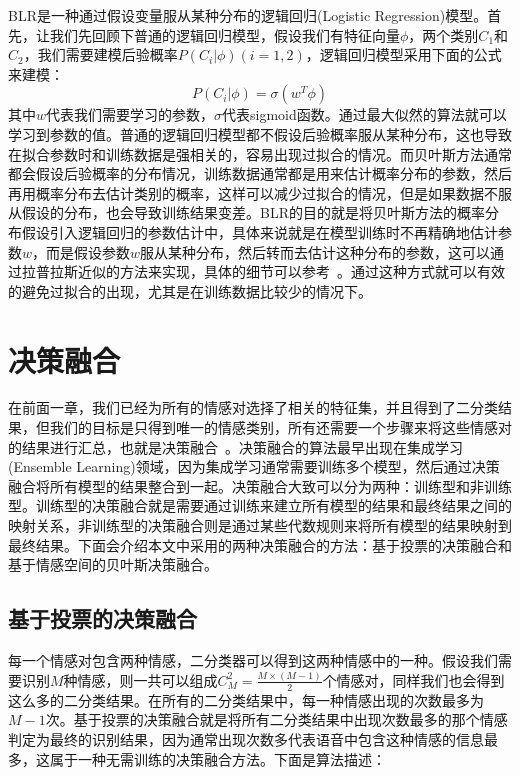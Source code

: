  BLR是一种通过假设变量服从某种分布的逻辑回归(Logistic Regression)模型。首先，让我们先回顾下普通的逻辑回归模型，假设我们有特征向量$\phi$，两个类别$C_1$和$C_2$，我们需要建模后验概率$P(C_i|\phi)(i=1,2)$，逻辑回归模型采用下面的公式来建模：
 \begin{equation}
\label{equ:lagrange_multiplier}
    P(C_i|\phi) = \sigma(w^T\phi)
\end{equation}
其中$w$代表我们需要学习的参数，$\sigma$代表sigmoid函数。通过最大似然的算法就可以学习到参数的值。普通的逻辑回归模型都不假设后验概率服从某种分布，这也导致在拟合参数时和训练数据是强相关的，容易出现过拟合的情况。而贝叶斯方法通常都会假设后验概率的分布情况，训练数据通常都是用来估计概率分布的参数，然后再用概率分布去估计类别的概率，这样可以减少过拟合的情况，但是如果数据不服从假设的分布，也会导致训练结果变差。BLR的目的就是将贝叶斯方法的概率分布假设引入逻辑回归的参数估计中，具体来说就是在模型训练时不再精确地估计参数$w$，而是假设参数$w$服从某种分布，然后转而去估计这种分布的参数，这可以通过拉普拉斯近似的方法来实现，具体的细节可以参考~\cite{Genkin2007Large}。通过这种方式就可以有效的避免过拟合的出现，尤其是在训练数据比较少的情况下。

\section{决策融合}
\label{sec:decision_fusion}
在前面一章，我们已经为所有的情感对选择了相关的特征集，并且得到了二分类结果，但我们的目标是只得到唯一的情感类别，所有还需要一个步骤来将这些情感对的结果进行汇总，也就是决策融合~\cite{Dasarathy1994Decision}。决策融合的算法最早出现在集成学习(Ensemble Learning)领域，因为集成学习通常需要训练多个模型，然后通过决策融合将所有模型的结果整合到一起。决策融合大致可以分为两种：训练型和非训练型。训练型的决策融合就是需要通过训练来建立所有模型的结果和最终结果之间的映射关系，非训练型的决策融合则是通过某些代数规则来将所有模型的结果映射到最终结果。下面会介绍本文中采用的两种决策融合的方法：基于投票的决策融合和基于情感空间的贝叶斯决策融合。

\subsection{基于投票的决策融合}
\label{ssec:voting_decision_fusion}
每一个情感对包含两种情感，二分类器可以得到这两种情感中的一种。假设我们需要识别$M$种情感，则一共可以组成$C_M^2 = \frac{M \times (M - 1)}{2}$个情感对，同样我们也会得到这么多的二分类结果。在所有的二分类结果中，每一种情感出现的次数最多为$M-1$次。基于投票的决策融合就是将所有二分类结果中出现次数最多的那个情感判定为最终的识别结果，因为通常出现次数多代表语音中包含这种情感的信息最多，这属于一种无需训练的决策融合方法。下面是算法描述：

